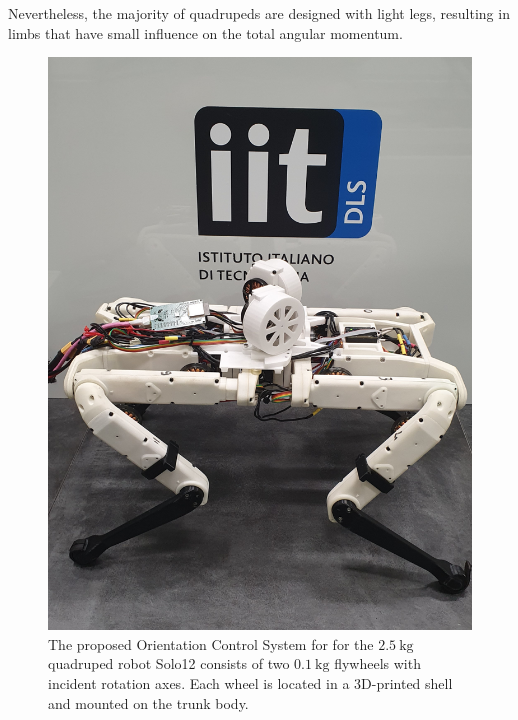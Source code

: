 \documentclass[letterpaper, 10 pt, conference]{ieeeconf}      %
\begin{document}
Nevertheless, the majority of quadrupeds are designed with light legs, resulting in limbs that have small influence on the total angular momentum.

\begin{figure}[t!]
	\centering
	\includegraphics[width=.7\linewidth]{figures/solo_fw_pic_compressed.png}
	\caption{\small The proposed Orientation Control System for 
		for the $2.5 \ \mathrm{kg}$ quadruped robot Solo12 consists of two $0.1 \ \mathrm{kg}$ flywheels with incident rotation axes. Each wheel is located in a 3D-printed shell and mounted on the trunk body.}
	\label{fig:solo12flywheels}
\end{figure} 
\end{document}
